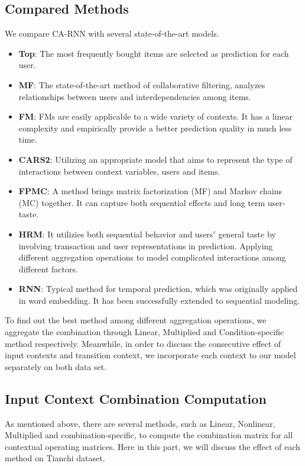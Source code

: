 \documentclass[conference]{IEEEtran}
\begin{document}
\subsection{Compared Methods}
We compare CA-RNN with several state-of-the-art models.
\begin{itemize}
\item \textbf{Top}: 
The most frequently bought items are selected as prediction for each user.
\item \textbf{MF}: 
The state-of-the-art method of collaborative filtering, analyzes relationships between users and interdependencies among items.
\item \textbf{FM}: 
FMs are easily applicable to a wide variety of contexts. It has a linear complexity and empirically provide a better prediction quality in much less time.
\item \textbf{CARS2}: 
Utilizing an appropriate model that aims to represent the type of interactions between context variables, users and items.
\item \textbf{FPMC}: 
A method brings matrix factorization (MF) and Markov chains (MC) together. It can capture
both sequential effects and long term user-taste.
\item \textbf{HRM}: 
It utilizies both sequential behavior and users$'$ general taste by involving transaction and user representations in prediction. Applying different aggregation operations to model complicated interactions among different factors.
\item \textbf{RNN}: 
Typical method for temporal prediction, which was originally applied in word embedding. It has been successfully extended to sequential modeling. 

\end{itemize}
To find out the best method among different aggregation operations, we aggregate the combination through Linear, Multiplied and Condition-specific method respectively. Meanwhile, in order to discuss the consecutive effect of input contexts and transition context, we incorporate each context to our model separately on both data set. 



\subsection{Input Context Combination Computation}
As mentioned above, there are several methods, such as Linear, Nonlinear, Multiplied and combination-specific, to compute the combination matrix for all contextual operating matrices. Here in this part, we will discuss the effect of each method on Tianchi dataset.
\end{document}
